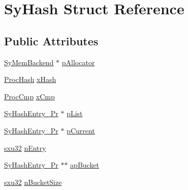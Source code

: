 \hypertarget{struct_sy_hash}{\section{Sy\-Hash Struct Reference}
\label{d9/da7/struct_sy_hash}
}
\subsection*{Public Attributes}
\begin{DoxyCompactItemize}
\item 
\hyperlink{struct_sy_mem_backend}{Sy\-Mem\-Backend} $\ast$ \hyperlink{struct_sy_hash_a458f6f84f685c225fee71e17c351370a}{p\-Allocator}
\item 
\hyperlink{unqlite_8c_a38d523bbe0ae0e849597c37b22bfe806}{Proc\-Hash} \hyperlink{struct_sy_hash_a7d93ecb0b817fbc658c0885cf76b4aaf}{x\-Hash}
\item 
\hyperlink{unqlite_8c_a60d84ee80a4995e96155889025d0603c}{Proc\-Cmp} \hyperlink{struct_sy_hash_a0fa65eed4a46c8509041af970b881e90}{x\-Cmp}
\item 
\hyperlink{struct_sy_hash_entry___pr}{Sy\-Hash\-Entry\-\_\-\-Pr} $\ast$ \hyperlink{struct_sy_hash_a0b42c072a791617181baa82cb777bb0e}{p\-List}
\item 
\hyperlink{struct_sy_hash_entry___pr}{Sy\-Hash\-Entry\-\_\-\-Pr} $\ast$ \hyperlink{struct_sy_hash_a86c520ee78f024f7d2280e0a9f7a34cd}{p\-Current}
\item 
\hyperlink{unqlite_8c_abc5a8a3f345c200c98c485551f49666e}{sxu32} \hyperlink{struct_sy_hash_a63df6ff0ce020df28b31ff6b98ab34b6}{n\-Entry}
\item 
\hyperlink{struct_sy_hash_entry___pr}{Sy\-Hash\-Entry\-\_\-\-Pr} $\ast$$\ast$ \hyperlink{struct_sy_hash_ad7565044e8b62b8413c3c6e38161f7ff}{ap\-Bucket}
\item 
\hyperlink{unqlite_8c_abc5a8a3f345c200c98c485551f49666e}{sxu32} \hyperlink{struct_sy_hash_a908d68d3af13b8a642c4d945ef94142f}{n\-Bucket\-Size}
\end{DoxyCompactItemize}


